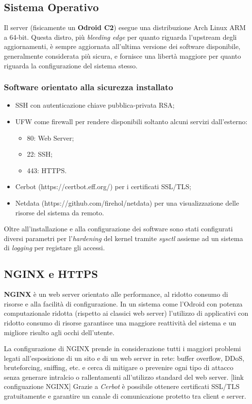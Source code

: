 \subsection{Sistema Operativo}
Il server (fisicamente un \textbf{Odroid C2}) esegue una distribuzione Arch Linux ARM a 64-bit. Questa distro, più \textit{bleeding edge} per quanto riguarda l'upstream degli aggiornamenti, è sempre aggiornata all'ultima versione dei software disponibile, generalmente considerata più sicura, e fornisce una libertà maggiore per quanto riguarda la configurazione del sistema stesso.

\subsubsection{Software orientato alla sicurezza installato}
\begin{itemize}
	\item SSH con autenticazione chiave pubblica-privata RSA;
	\item UFW come firewall per rendere disponibili soltanto alcuni servizi dall'esterno:
	\begin{itemize}
		\item 80: Web Server;
		\item 22: SSH;
		\item 443: HTTPS.
	\end{itemize}
	\item Cerbot (https://certbot.eff.org/) per i certificati SSL/TLS;
	\item Netdata (https://github.com/firehol/netdata) per una visualizzazione delle risorse del sistema da remoto.
\end{itemize}
Oltre all'installazione e alla configurazione dei software sono stati configurati diversi parametri per l'\textit{hardening} del kernel tramite \textit{sysctl} assieme ad un sistema di \textit{logging} per registare gli accessi.

\subsection{NGINX e HTTPS}
\textbf{NGINX} è un web server orientato alle performance, al ridotto consumo di risorse e alla facilità di configurazione.
In un sistema come l'Odroid con potenza computazionale ridotta (rispetto ai classici web server) l'utilizzo di applicativi con ridotto consumo di risorse garantisce una maggiore reattività del sistema e un migliore risulto agli occhi dell'utente.

La configurazione di NGINX prende in considerazione tutti i maggiori problemi legati all'esposizione di un sito e di un web server in rete: buffer overflow, DDoS, bruteforcing, sniffing, etc. e cerca di mitigare o prevenire ogni tipo di attacco senza generare intralcio o rallentamenti all'utilizzo standard del web server.
[link configuazione NGINX]
Grazie a \textit{Cerbot} è possibile ottenere certificati SSL/TLS gratuitamente e garantire un canale di comunicazione protetto tra client e server.

